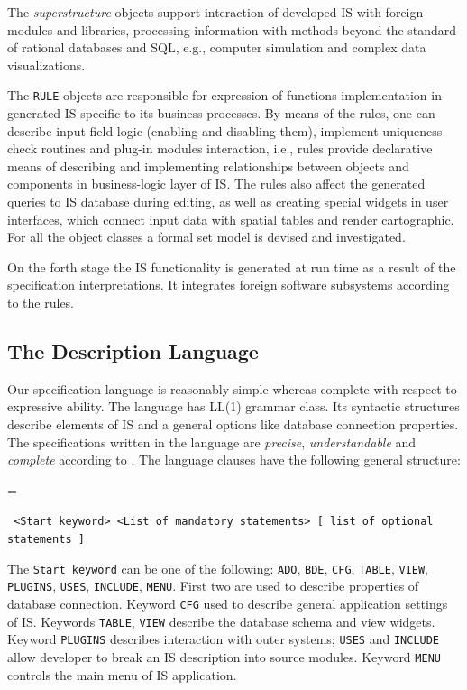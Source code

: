 \documentclass[conference]{IEEEtran}
\newcommand{\e}[2][fcolor]{\textcolor{pcolor}{[}\textcolor{#1}{#2}\textcolor{pcolor}{]}}
\newenvironment{asdcode}{\hangindent=\parindent\hangafter=1\par\noindent\small\tt}{}
\begin{document}
The \emph{superstructure} objects support interaction of developed IS with foreign modules and libraries, processing information with methods beyond the standard of rational databases and SQL, e.g., computer simulation and complex data visualizations.

The \texttt{RULE} objects are responsible for expression of functions implementation in generated IS specific to its business-processes.  By means of the rules, one can describe input field logic (enabling and disabling them), implement uniqueness check routines and plug-in modules interaction, i.e., rules provide declarative means of describing and implementing relationships between objects and components in business-logic layer of IS.  The rules also affect the generated queries to IS database during editing, as well as creating special widgets in user interfaces, which connect input data with spatial tables and render cartographic. For all the object classes a formal set model is devised and investigated.  %

On the forth stage the IS functionality is generated at run time as a result of the specification interpretations.  It integrates foreign software subsystems according to the rules. %

\subsection{The Description Language}

Our specification language is reasonably simple whereas complete with respect to expressive ability.  The language has LL(1) grammar class.  Its syntactic structures describe elements of IS and a general options like database connection properties.  The specifications written in the language are \emph{precise}, \emph{understandable} and \emph{complete} according to \cite{aga1,aga2}.  The language clauses have the following general structure:

\begin{asdcode}%
<Start keyword> <List of mandatory statements> [~list of optional statements~]
\end{asdcode}

The \texttt{Start keyword} can be one of the following: \texttt{ADO}, \texttt{BDE}, \texttt{CFG}, \texttt{TABLE}, \texttt{VIEW}, \texttt{PLUGINS}, \texttt{USES}, \texttt{INCLUDE}, \texttt{MENU}.  First two are used to describe properties of database connection.  Keyword \texttt{CFG} used to describe general application settings of IS.  Keywords \texttt{TABLE}, \texttt{VIEW} describe the database schema and view widgets.  Keyword \texttt{PLUGINS} describes interaction with outer systems; \texttt{USES} and \texttt{INCLUDE} allow developer to break an IS description into source modules.  Keyword \texttt{MENU} controls the main menu of IS application.
\end{document}
